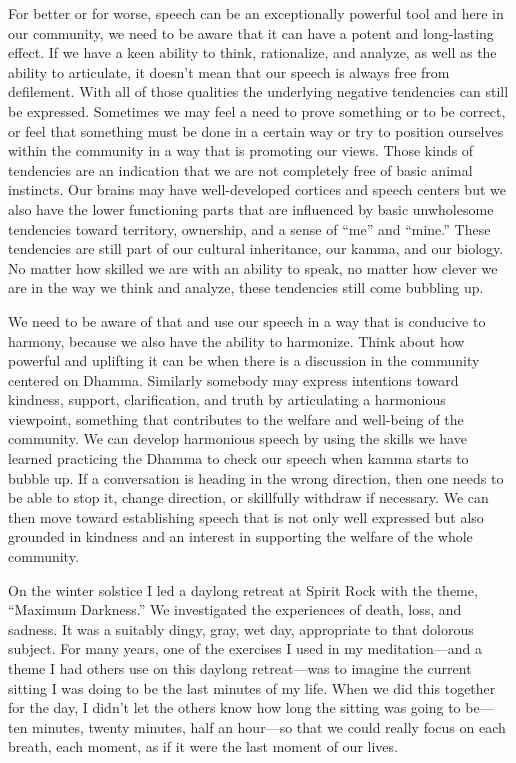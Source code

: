 For better or for worse, speech can be an exceptionally powerful tool 
and here in our community, we need to be aware that it can have a 
potent and long-lasting effect. If we have a keen ability to think, 
rationalize, and analyze, as well as the ability to articulate, it 
doesn't mean that our speech is always free from defilement. With all 
of those qualities the underlying negative tendencies can still be 
expressed. Sometimes we may feel a need to prove something or to be 
correct, or feel that something must be done in a certain way or try to 
position ourselves within the community in a way that is promoting our 
views. Those kinds of tendencies are an indication that we are not 
completely free of basic animal instincts. Our brains may have 
well-developed cortices and speech centers but we also have the lower 
functioning parts that are influenced by basic unwholesome tendencies 
toward territory, ownership, and a sense of ``me'' and ``mine.'' These 
tendencies are still part of our cultural inheritance, our kamma, and 
our biology. No matter how skilled we are with an ability to speak, no 
matter how clever we are in the way we think and analyze, these 
tendencies still come bubbling up.

We need to be aware of that and use our speech in a way that is 
conducive to harmony, because we also have the ability to harmonize. 
Think about how powerful and uplifting it can be when there is a 
discussion in the community centered on Dhamma. Similarly somebody may 
express intentions toward kindness, support, clarification, and truth 
by articulating a harmonious viewpoint, something that contributes to 
the welfare and well-being of the community. We can develop harmonious 
speech by using the skills we have learned practicing the Dhamma to 
check our speech when kamma starts to bubble up. If a conversation is 
heading in the wrong direction, then one needs to be able to stop it, 
change direction, or skillfully withdraw if necessary. We can then move 
toward establishing speech that is not only well expressed but also 
grounded in kindness and an interest in supporting the welfare of the 
whole community.


On the winter solstice I led a daylong retreat at Spirit Rock with the 
theme, ``Maximum Darkness.'' We investigated the experiences of death, 
loss, and sadness. It was a suitably dingy, gray, wet day, appropriate 
to that dolorous subject. For many years, one of the exercises I used 
in my meditation---and a theme I had others use on this daylong 
retreat---was to imagine the current sitting I was doing to be the last 
minutes of my life. When we did this together for the day, I didn't let 
the others know how long the sitting was going to be---ten minutes, 
twenty minutes, half an hour---so that we could really focus on each 
breath, each moment, as if it were the last moment of our lives.

